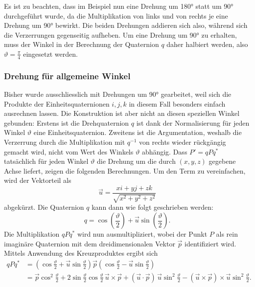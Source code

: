 Es ist zu beachten, dass im Beispiel nun eine Drehung um 180° statt um 90° 
durchgeführt wurde, da die Multiplikation von links und von rechts je eine 
Drehung um 90° bewirkt. Die beiden Drehungen addieren sich also, während sich 
die Verzerrungen gegenseitig aufheben. Um eine Drehung um 90° zu erhalten, muss 
der Winkel in der Berechnung der Quaternion $q$ daher halbiert werden, also 
$\vartheta = \frac{\pi}{4}$ eingesetzt werden. 

\subsubsection{Drehung für allgemeine Winkel}

Bisher wurde ausschliesslich mit Drehungen um 90° gearbeitet, weil sich die
Produkte der Einheitsquaternionen $i,j,k$ in diesem Fall besonders einfach
ausrechnen lassen. Die Konstruktion ist aber nicht an diesen speziellen Winkel
gebunden: Erstens ist die Drehquaternion $q$ ist dank der Normalisierung für jeden Winkel 
$\vartheta$ eine Einheitsquaternion. Zweitens ist die Argumentation, weshalb die Verzerrung durch die 
Multiplikation mit $q^{-1}$ von rechts wieder rückgängig gemacht wird, nicht
vom Wert des Winkels $\vartheta$ abhängig. Dass $P' = qPq^{*}$ tatsächlich 
für jeden Winkel $\vartheta$ die Drehung um die durch $(x,y,z)$ gegebene Achse 
liefert, zeigen die folgenden Berechnungen. Um den Term zu vereinfachen,
wird der Vektorteil als 
\begin{equation*}
    \vec{u} = \frac{xi + yj + zk}{\sqrt{x^2 + y^2 + z^2}}
\end{equation*}
abgekürzt. Die Quaternion $q$ kann dann wie folgt geschrieben werden:
\begin{equation*}
    q = \cos\left(\frac{\vartheta}{2}\right) + \vec{u} \sin\left(\frac{\vartheta}{2}\right).
\end{equation*}
Die Multiplikation $qPq^{*}$ wird nun ausmultipliziert, wobei der Punkt $P$
als rein imaginäre Quaternion mit dem dreidimensionalen Vektor $\vec{p}$ identifiziert wird.
Mittels Anwendung des Kreuzproduktes ergibt sich
\begin{align*}
    qPq^{*}
    &= \left(\cos\frac{\vartheta}{2} + \vec{u}\sin\frac{\vartheta}{2}\right)
    \vec{p}
    \left(\cos\frac{\vartheta}{2} - \vec{u}\sin\frac{\vartheta}{2}\right) \\
    &= \vec{p}\cos^2\frac{\vartheta}{2}
    + 2\sin\frac{\vartheta}{2}\cos\frac{\vartheta}{2}\,\vec{u}\times\vec{p}
    + (\vec{u}\cdot\vec{p})\,\vec{u}\sin^2\frac{\vartheta}{2}
    - (\vec{u}\times\vec{p})\times\vec{u}\sin^2\frac{\vartheta}{2}.
\end{align*}
